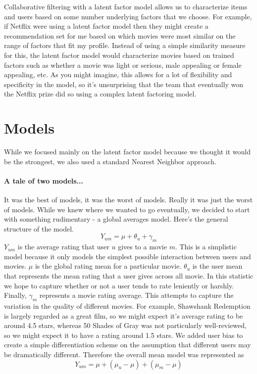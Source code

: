 \documentclass[fleqn,10pt]{SelfArx} %
\begin{document}
\noindent Collaborative filtering with a latent factor model allows us to characterize items and users based on some number underlying factors that we choose. For example, if Netflix were using a latent factor model then they might create a recommendation set for me based on which movies were most similar on the range of factors that fit my profile. Instead of using a simple similarity measure for this, the latent factor model would characterize movies based on trained factors such as whether a movie was light or serious, male appealing or female appealing, etc. As you might imagine, this allows for a lot of flexibility and specificity in the model, so it's unsurprising that the team that eventually won the Netflix prize did so using a complex latent factoring model.


\section{Models}
While we focused mainly on the latent factor model because we thought it would be the strongest, we also used a standard Nearest Neighbor approach.
\paragraph{A tale of two models...}
It was the best of models, it was the worst of models. Really it was just the worst of models. While we knew where we wanted to go eventually, we decided to start with something rudimentary - a global averages model. Here's the general structure of the model.
$$Y_{um} = \mu + \theta_u + \gamma_m$$
$Y_{um}$ is the average rating that user $u$ gives to a movie $m$. This is a simplistic model because it only models the simplest possible interaction between users and movies. $\mu$ is the global rating mean for a particular movie. $\theta_u$ is the user mean that represents the mean rating that a user gives across all movie. In this statistic we hope to capture whether or not a user tends to rate leniently or harshly. Finally, $\gamma_m$ represents a movie rating average. This attempts to capture the variation in the quality of different movies. For example, Shawshank Redemption is largely regarded as a great film, so we might expect it's average rating to be around 4.5 stars, whereas 50 Shades of Gray was not particularly well-reviewed, so we might expect it to have a rating around 1.5 stars. We added user bias to create a simple differentiation scheme on the assumption that different users may be dramatically different. Therefore the overall mean model was represented as
$$Y_{um} = \mu + (\mu_u - \mu) + (\mu_m - \mu)$$
\end{document}
